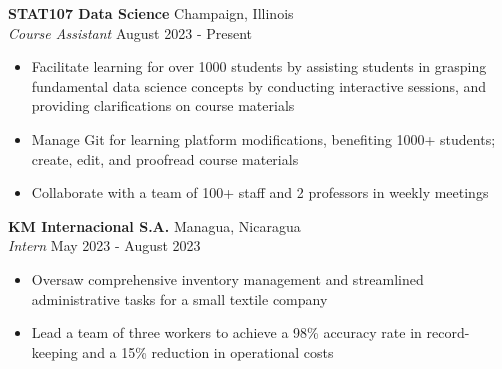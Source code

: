 \documentclass[a4paper]{article}
\begin{document}
\vspace{1mm}


\textbf{STAT107 Data Science} 
\hfill Champaign, Illinois\\
\textit{Course Assistant} \hfill August 2023 - Present\\
    \begin{itemize}[noitemsep]
    \item Facilitate learning for over 1000 students by assisting 
    students in grasping fundamental
    data science concepts by conducting interactive sessions,
    and providing clarifications on course materials
    \item Manage Git for learning platform modifications, 
    benefiting 1000+ students; create, edit, and proofread course materials
    \item Collaborate with a team of 100+ staff and 2 professors in weekly meetings 
    \end{itemize}

    \vspace{1mm}

\textbf{KM Internacional S.A.} \hfill Managua, Nicaragua\\
\textit{Intern} \hfill May 2023 - August 2023\\
    \begin{itemize}[noitemsep]
	\item  Oversaw comprehensive inventory management and streamlined
     administrative tasks for a small textile company
    \item Lead a team of three workers to achieve a 98\% 
    accuracy rate in record-keeping 
    and a 15\% reduction in operational costs
\end{itemize}
\end{document}

